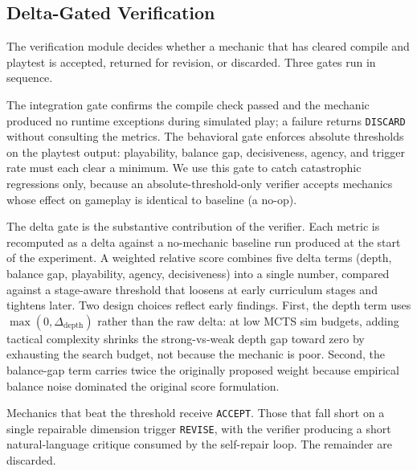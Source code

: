 \documentclass[conference]{IEEEtran}
\begin{document}
   \subsection{Delta-Gated Verification}                                         
                                                                              
  The verification module decides whether a mechanic that has cleared compile   
  and playtest is accepted, returned for revision, or discarded. Three gates run
   in sequence.                                                                 
                                                                              
  The integration gate confirms the compile check passed and the mechanic
  produced no runtime exceptions during simulated play; a failure returns
  \texttt{DISCARD} without consulting the metrics. The behavioral gate enforces
  absolute thresholds on the playtest output: playability, balance gap,         
  decisiveness, agency, and trigger rate must each clear a minimum. We use this 
  gate to catch catastrophic regressions only, because an                       
  absolute-threshold-only verifier accepts mechanics whose effect on gameplay is
   identical to baseline (a no-op).                                           
                                                                                
  The delta gate is the substantive contribution of the verifier. Each metric is
   recomputed as a delta against a no-mechanic baseline run produced at the     
  start of the experiment. A weighted relative score combines five delta terms
  (depth, balance gap, playability, agency, decisiveness) into a single number,
  compared against a stage-aware threshold that loosens at early curriculum
  stages and tightens later. Two design choices reflect early findings. First,
  the depth term uses $\max(0, \Delta_\text{depth})$ rather than the raw delta:
  at low MCTS sim budgets, adding tactical complexity shrinks the strong-vs-weak
   depth gap toward zero by exhausting the search budget, not because the       
  mechanic is poor. Second, the balance-gap term carries twice the originally
  proposed weight because empirical balance noise dominated the original score  
  formulation.                                                                

  Mechanics that beat the threshold receive \texttt{ACCEPT}. Those that fall
  short on a single repairable dimension trigger \texttt{REVISE}, with the
  verifier producing a short natural-language critique consumed by the
  self-repair loop. The remainder are discarded.
\end{document}
